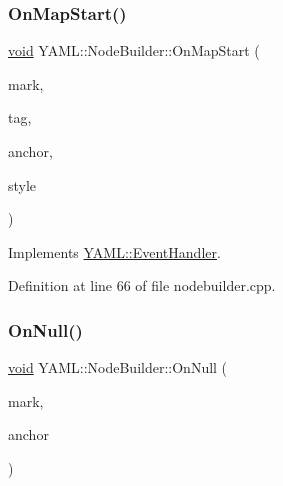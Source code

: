 \subsubsection{\texorpdfstring{OnMapStart()}{OnMapStart()}}
{\footnotesize\ttfamily \mbox{\hyperlink{glad_8h_a950fc91edb4504f62f1c577bf4727c29}{void}} Y\+A\+M\+L\+::\+Node\+Builder\+::\+On\+Map\+Start (\begin{DoxyParamCaption}\item[{const \mbox{\hyperlink{struct_y_a_m_l_1_1_mark}{Mark}} \&}]{mark,  }\item[{const \mbox{\hyperlink{glad_8h_ac83513893df92266f79a515488701770}{std\+::string}} \&}]{tag,  }\item[{\mbox{\hyperlink{namespace_y_a_m_l_abeff1798814ae3402fc5665fdcad1de6}{anchor\+\_\+t}}}]{anchor,  }\item[{\mbox{\hyperlink{struct_y_a_m_l_1_1_emitter_style_ae86640662c85ce6062a37f9636b6959f}{Emitter\+Style\+::value}}}]{style }\end{DoxyParamCaption})\hspace{0.3cm}{\ttfamily [virtual]}}



Implements \mbox{\hyperlink{class_y_a_m_l_1_1_event_handler_a57fc2477cb1f4fd3a650e41180e6f9b6}{Y\+A\+M\+L\+::\+Event\+Handler}}.



Definition at line 66 of file nodebuilder.\+cpp.

\mbox{\label{class_y_a_m_l_1_1_node_builder_a7fb5d6a9d2e1c1688bf0b8e1881dc5bf}} 
\subsubsection{\texorpdfstring{OnNull()}{OnNull()}}
{\footnotesize\ttfamily \mbox{\hyperlink{glad_8h_a950fc91edb4504f62f1c577bf4727c29}{void}} Y\+A\+M\+L\+::\+Node\+Builder\+::\+On\+Null (\begin{DoxyParamCaption}\item[{const \mbox{\hyperlink{struct_y_a_m_l_1_1_mark}{Mark}} \&}]{mark,  }\item[{\mbox{\hyperlink{namespace_y_a_m_l_abeff1798814ae3402fc5665fdcad1de6}{anchor\+\_\+t}}}]{anchor }\end{DoxyParamCaption})\hspace{0.3cm}{\ttfamily [virtual]}}



